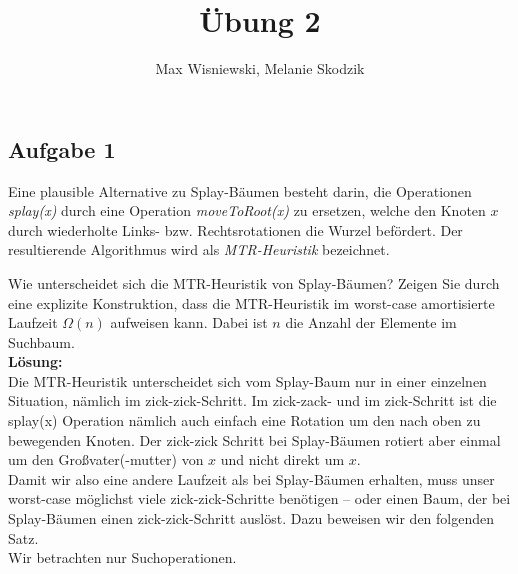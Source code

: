 \documentclass[11pt,a4paper,ngerman]{article}
\date{}
\title{Übung 2}
\author{Max Wisniewski, Melanie Skodzik}
\begin{document}

\renewcommand{\figurename}{Figure}

\maketitle
\thispagestyle{fancy}


\subsection*{Aufgabe 1}


Eine plausible Alternative zu Splay-Bäumen besteht darin, die Operationen \emph{splay(x)} durch eine Operation \emph{moveToRoot(x)} zu ersetzen, welche den Knoten $x$ durch wiederholte Links- bzw. Rechtsrotationen die Wurzel befördert. Der resultierende Algorithmus wird als \emph{MTR-Heuristik} bezeichnet.

Wie unterscheidet sich die MTR-Heuristik von Splay-Bäumen? Zeigen Sie durch eine explizite Konstruktion, dass die MTR-Heuristik im worst-case amortisierte Laufzeit $\Omega(n)$ aufweisen kann. Dabei ist $n$ die Anzahl der Elemente im Suchbaum.\\

\noindent\textbf{Lösung:}\\

Die MTR-Heuristik unterscheidet sich vom Splay-Baum nur in einer einzelnen Situation, nämlich im zick-zick-Schritt. Im zick-zack- und im zick-Schritt ist die splay(x) Operation nämlich auch einfach eine Rotation um den nach oben zu bewegenden Knoten. Der zick-zick Schritt bei Splay-Bäumen rotiert aber einmal um den Großvater(-mutter) von $x$ und nicht direkt um $x$.\\

Damit wir also eine andere Laufzeit als bei Splay-Bäumen erhalten, muss unser worst-case möglichst viele zick-zick-Schritte benötigen -- oder einen Baum, der bei Splay-Bäumen einen zick-zick-Schritt auslöst. Dazu beweisen wir den folgenden Satz.\\

Wir betrachten nur Suchoperationen.
\end{document}
